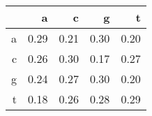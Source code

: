 \begingroup\tiny
\begin{tabular}{rrrrr}
  \hline
 & a & c & g & t \\ 
  \hline
a & 0.29 & 0.21 & 0.30 & 0.20 \\ 
  c & 0.26 & 0.30 & 0.17 & 0.27 \\ 
  g & 0.24 & 0.27 & 0.30 & 0.20 \\ 
  t & 0.18 & 0.26 & 0.28 & 0.29 \\ 
   \hline
\end{tabular}
\endgroup
